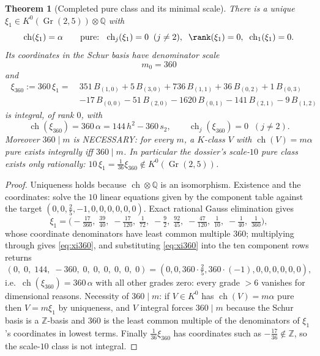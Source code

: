 \documentclass[11pt]{article}
\newtheorem{theorem}{Theorem}
\theoremstyle{definition}
\newcommand{\ch}{\operatorname{ch}}
\newcommand{\Gr}{\operatorname{Gr}}
\newcommand{\tensor}{\otimes}
\begin{document}
\begin{theorem}[Completed pure class and its minimal scale]
\label{th:pure}
There is a unique $\xi_1\in K^0(\Gr(2,5))\tensor\mathbb Q$ with
\[
\ch(\xi_1)=\alpha
\qquad\text{pure: }\; \ch_j(\xi_1)=0\;\;(j\ne 2),\;\;
\rank(\xi_1)=0,\;\; \ch_1(\xi_1)=0 .
\]
Its coordinates in the Schur basis have denominator scale
\[
\boxed{\;m_0=360\;}
\]
and
\begin{equation}
\boxed{\;\begin{aligned}
\xi_{360}:=360\,\xi_1={\ }&
351\,B_{(1,0)}+5\,B_{(3,0)}+736\,B_{(1,1)}+36\,B_{(0,2)}+1\,B_{(0,3)}\\
&-17\,B_{(0,0)}-51\,B_{(2,0)}-1620\,B_{(0,1)}-141\,B_{(2,1)}
-9\,B_{(1,2)}
\end{aligned}\;}
\label{eq:xi360}
\end{equation}
is integral, of rank $0$, with
\[
\ch(\xi_{360})=360\,\alpha=144\,h^2-360\,s_2,
\qquad
\ch_j(\xi_{360})=0\;\;(j\ne 2).
\]
Moreover $360\mid m$ is NECESSARY: for every $m$, a $K$-class $V$ with
$\ch(V)=m\alpha$ pure exists integrally iff $360\mid m$. In particular
the dossier's scale-$10$ pure class exists only rationally:
$10\,\xi_1=\tfrac1{36}\xi_{360}\notin K^0(\Gr(2,5))$.
\end{theorem}

\begin{proof}
Uniqueness holds because $\ch\tensor\mathbb Q$ is an isomorphism.
Existence and the coordinates: solve the $10$ linear equations given by
the component table against the target
$(0,0,\tfrac25,-1,0,0,0,0,0,0)$. Exact rational Gauss elimination
gives
\[
\xi_1=\bigl(-\tfrac{17}{360},\;\tfrac{39}{40},\;-\tfrac{17}{120},\;
\tfrac1{72},\;-\tfrac92,\;\tfrac{92}{45},\;-\tfrac{47}{120},\;
\tfrac1{10},\;-\tfrac1{40},\;\tfrac1{360}\bigr),
\]
whose coordinate denominators have least common multiple $360$;
multiplying through gives \eqref{eq:xi360}, and substituting
\eqref{eq:xi360} into the ten component rows returns
\[
(0,\;0,\;144,\;-360,\;0,\;0,\;0,\;0,\;0,\;0)
=(0,0,360\cdot\tfrac25,360\cdot(-1),0,0,0,0,0,0),
\]
i.e.\ $\ch(\xi_{360})=360\,\alpha$ with all other grades zero: every
grade $>6$ vanishes for dimensional reasons. Necessity of $360\mid m$:
if $V\in K^0$ has $\ch(V)=m\alpha$ pure then $V=m\xi_1$ by uniqueness,
and $V$ integral forces $360\mid m$ because the Schur basis is a
$\mathbb Z$-basis and $360$ is the least common multiple of the
denominators of $\xi_1$'s coordinates in lowest terms. Finally
$\tfrac1{36}\xi_{360}$ has coordinates such as
$-\tfrac{17}{36}\notin\mathbb Z$, so the scale-$10$ class is not
integral.
\end{proof}
\end{document}

